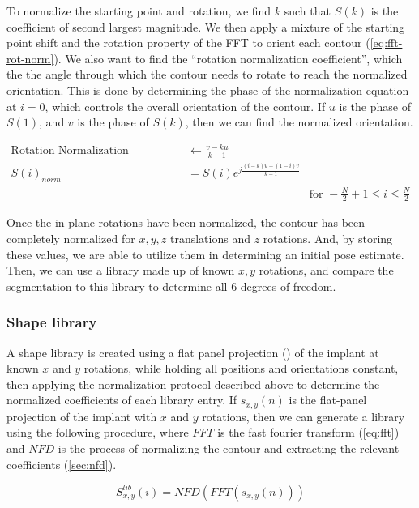 To normalize the starting point and rotation, we find $k$ such that $S(k)$ is the coefficient of second largest magnitude. We then apply a mixture of the starting point shift and the rotation property of the FFT to orient each contour (\cref{eq:fft-rot-norm}). We also want to find the ``rotation normalization coefficient'', which the the angle through which the contour needs to rotate to reach the normalized orientation. This is done by determining the phase of the normalization equation at $i = 0$, which controls the overall orientation of the contour. If $u$ is the phase of $S(1)$, and $v$ is the phase of $S(k)$, then we can find the normalized orientation.

\begin{equation}
    \begin{aligned}
    \text{Rotation Normalization Coefficient} &\leftarrow \frac{v - ku}{k-1}\\
    S(i)_{norm} &= S(i)e^{j\frac{(i-k)u + (1-i)v}{k-1}} & \\
    & & \text{for } - \frac{N}{2}+1 \le i \le \frac{N}{2}
    \end{aligned}
    \label{eq:fft-rot-norm}
\end{equation}

Once the in-plane rotations have been normalized, the contour has been completely normalized for $x, y,z$ translations and $z$ rotations. And, by storing these values, we are able to utilize them in determining an initial pose estimate. Then, we can use a library made up of known $x,y$ rotations, and compare the segmentation to this library to determine all 6 degrees-of-freedom.

\subsubsection{Shape library}
A shape library is created using a flat panel projection () of the implant at known $x$ and $y$ rotations, while holding all positions and orientations constant, then applying the normalization protocol described above to determine the normalized coefficients of each library entry. If $s_{x,y}(n)$ is the flat-panel projection of the implant with $x$ and $y$ rotations, then we can generate a library using the following procedure, where $FFT$ is the fast fourier transform (\cref{eq:fft}) and $NFD$ is the process of normalizing the contour and extracting the relevant coefficients (\cref{sec:nfd}).

\begin{equation}
    S^{lib}_{x,y}(i) = NFD(FFT(s_{x,y}(n)))
    \label{eq:lib-generation}
\end{equation}

